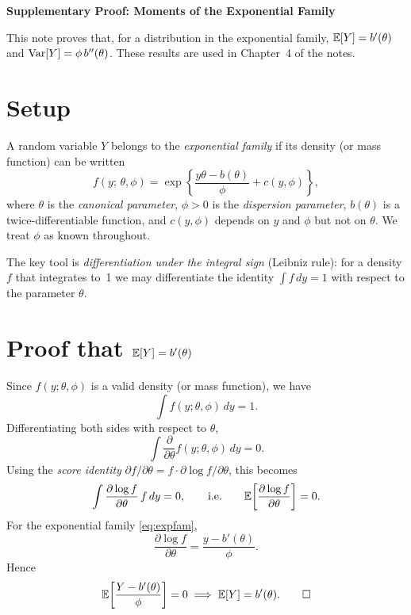 



\moduleheader

\begin{center}
  {\Large\bfseries Supplementary Proof: Moments of the Exponential Family}
\end{center}

\bigskip

\noindent This note proves that, for a distribution in the exponential
family, $\mathbb{E}[Y] = b'(\theta)$ and $\mathrm{Var}[Y] = \phi\,b''(\theta)$.
These results are used in Chapter~4 of the notes.

\section*{Setup}

A random variable $Y$ belongs to the \emph{exponential family} if its
density (or mass function) can be written
\begin{equation}
  f(y;\,\theta,\phi)
  = \exp\!\left\{\frac{y\theta - b(\theta)}{\phi} + c(y,\phi)\right\},
  \label{eq:expfam}
\end{equation}
where $\theta$ is the \emph{canonical parameter}, $\phi > 0$ is the
\emph{dispersion parameter}, $b(\theta)$ is a twice-differentiable
function, and $c(y,\phi)$ depends on $y$ and $\phi$ but not on
$\theta$.  We treat $\phi$ as known throughout.

The key tool is \emph{differentiation under the integral sign}
(Leibniz rule): for a density $f$ that integrates to~1 we may
differentiate the identity $\int f\,dy = 1$ with respect to the
parameter $\theta$.

\section*{Proof that $\mathbb{E}[Y] = b'(\theta)$}

Since $f(y;\theta,\phi)$ is a valid density (or mass function), we have
\[
  \int f(y;\theta,\phi)\,dy = 1.
\]
Differentiating both sides with respect to $\theta$,
\[
  \int \frac{\partial}{\partial\theta} f(y;\theta,\phi)\,dy = 0.
\]
Using the \emph{score identity}
$\partial f/\partial\theta = f \cdot \partial\log f/\partial\theta$,
this becomes
\[
  \int \frac{\partial \log f}{\partial\theta}\,f\,dy = 0,
  \qquad\text{i.e.}\qquad
  \mathbb{E}\!\left[\frac{\partial \log f}{\partial\theta}\right] = 0.
\]
For the exponential family \eqref{eq:expfam},
\[
  \frac{\partial \log f}{\partial\theta}
  = \frac{y - b'(\theta)}{\phi}.
\]
Hence
\[
  \mathbb{E}\!\left[\frac{Y - b'(\theta)}{\phi}\right] = 0
  \implies
  \mathbb{E}[Y] = b'(\theta). \qquad\square
\]

